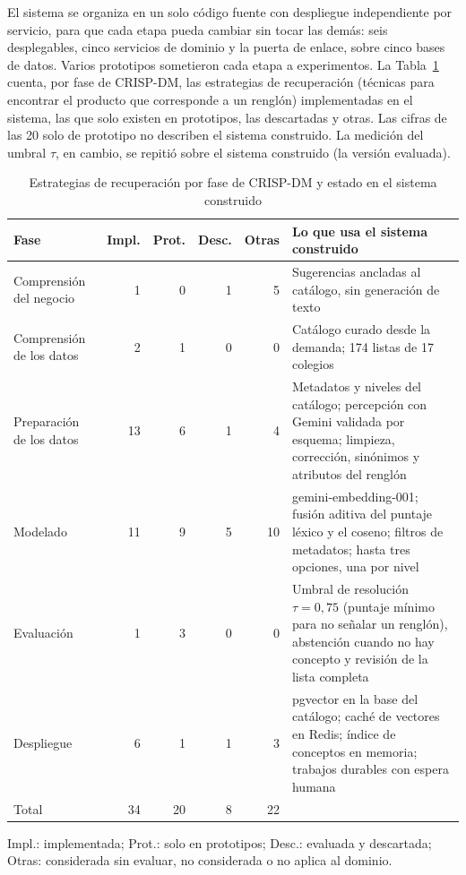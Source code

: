 El sistema se organiza en un solo código fuente con despliegue independiente por servicio, para que cada etapa pueda cambiar sin tocar las demás:
seis desplegables, cinco servicios de dominio y la puerta de enlace, sobre cinco bases de datos. Varios
prototipos sometieron cada etapa a experimentos. La Tabla~\ref{tab:rag-fases} cuenta, por fase de CRISP-DM, las estrategias de
recuperación (técnicas para encontrar el producto que corresponde a un renglón) implementadas en el
sistema, las que solo existen en prototipos, las descartadas y otras. Las cifras de las 20 solo
de prototipo no describen el sistema construido. La medición del umbral $\tau$, en cambio, se repitió sobre el sistema construido (la versión evaluada).

\begin{table}[htbp]
\centering
\caption{Estrategias de recuperación por fase de CRISP-DM y estado en el sistema construido}
\label{tab:rag-fases}
\footnotesize
\begin{tabular}{@{}lrrrrp{6.2cm}@{}}
\toprule
\textbf{Fase} & \textbf{Impl.} & \textbf{Prot.} & \textbf{Desc.} & \textbf{Otras} & \textbf{Lo que usa el sistema construido} \\
\midrule
Comprensión del negocio & 1 & 0 & 1 & 5 & Sugerencias ancladas al catálogo, sin generación de texto \\
Comprensión de los datos & 2 & 1 & 0 & 0 & Catálogo curado desde la demanda; 174 listas de 17 colegios \\
Preparación de los datos & 13 & 6 & 1 & 4 & Metadatos y niveles del catálogo; percepción con Gemini validada por esquema; limpieza, corrección, sinónimos y atributos del renglón \\
Modelado & 11 & 9 & 5 & 10 & gemini-embedding-001; fusión aditiva del puntaje léxico y el coseno; filtros de metadatos; hasta tres opciones, una por nivel \\
Evaluación & 1 & 3 & 0 & 0 & Umbral de resolución $\tau=0{,}75$ (puntaje mínimo para no señalar un renglón), abstención cuando no hay concepto y revisión de la lista completa \\
Despliegue & 6 & 1 & 1 & 3 & pgvector en la base del catálogo; caché de vectores en Redis; índice de conceptos en memoria; trabajos durables con espera humana \\
\midrule
Total & 34 & 20 & 8 & 22 & \\
\bottomrule
\end{tabular}
\par\smallskip
{\footnotesize Impl.: implementada; Prot.: solo en prototipos; Desc.: evaluada y descartada; Otras: considerada sin evaluar, no considerada o no aplica al dominio.}
\end{table}

